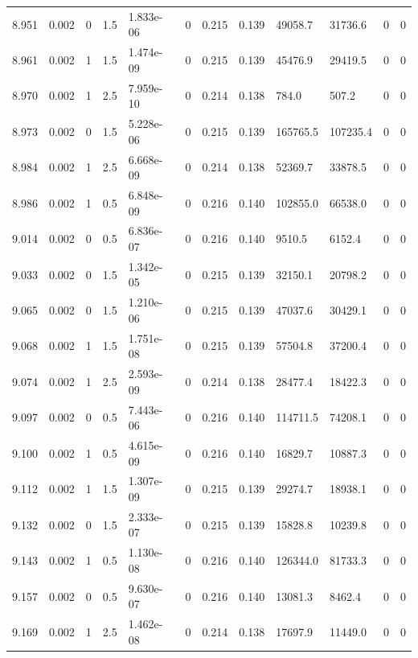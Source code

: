 \documentclass[preview]{standalone}
\begin{document}
{{{{{{{{{{{{{{{{\begin{tabular}{L{1.2cm}C{1.2cm} C{0.3cm}C{0.5cm} C{1.4cm}C{1.4cm} C{1.4cm}C{1.4cm} C{1.6cm}C{1.6cm} C{1.6cm}C{1.6cm}}
  8.951  &  0.002  & 0     & 1.5 &  1.833e-06  & 0  &  0.215&   0.139& 49058.7 & 31736.6   &  0 & 0  \\ 
  8.961  &  0.002  & 1     & 1.5 &  1.474e-09  & 0  &  0.215&   0.139& 45476.9 & 29419.5   &  0 & 0  \\ 
  8.970  &  0.002  & 1     & 2.5 &  7.959e-10  & 0  &  0.214&   0.138& 784.0 & 507.2   &  0 & 0  \\ 
  8.973  &  0.002  & 0     & 1.5 &  5.228e-06  & 0  &  0.215&   0.139& 165765.5 & 107235.4   &  0 & 0  \\ 
  8.984  &  0.002  & 1     & 2.5 &  6.668e-09  & 0  &  0.214&   0.138& 52369.7 & 33878.5   &  0 & 0  \\ 
  8.986  &  0.002  & 1     & 0.5 &  6.848e-09  & 0  &  0.216&   0.140& 102855.0 & 66538.0   &  0 & 0  \\ 
  9.014  &  0.002  & 0     & 0.5 &  6.836e-07  & 0  &  0.216&   0.140& 9510.5 & 6152.4   &  0 & 0  \\ 
  9.033  &  0.002  & 0     & 1.5 &  1.342e-05  & 0  &  0.215&   0.139& 32150.1 & 20798.2   &  0 & 0  \\ 
  9.065  &  0.002  & 0     & 1.5 &  1.210e-06  & 0  &  0.215&   0.139& 47037.6 & 30429.1   &  0 & 0  \\ 
  9.068  &  0.002  & 1     & 1.5 &  1.751e-08  & 0  &  0.215&   0.139& 57504.8 & 37200.4   &  0 & 0  \\ 
  9.074  &  0.002  & 1     & 2.5 &  2.593e-09  & 0  &  0.214&   0.138& 28477.4 & 18422.3   &  0 & 0  \\ 
  9.097  &  0.002  & 0     & 0.5 &  7.443e-06  & 0  &  0.216&   0.140& 114711.5 & 74208.1   &  0 & 0  \\ 
  9.100  &  0.002  & 1     & 0.5 &  4.615e-09  & 0  &  0.216&   0.140& 16829.7 & 10887.3   &  0 & 0  \\ 
  9.112  &  0.002  & 1     & 1.5 &  1.307e-09  & 0  &  0.215&   0.139& 29274.7 & 18938.1   &  0 & 0  \\ 
  9.132  &  0.002  & 0     & 1.5 &  2.333e-07  & 0  &  0.215&   0.139& 15828.8 & 10239.8   &  0 & 0  \\ 
  9.143  &  0.002  & 1     & 0.5 &  1.130e-08  & 0  &  0.216&   0.140& 126344.0 & 81733.3   &  0 & 0  \\ 
  9.157  &  0.002  & 0     & 0.5 &  9.630e-07  & 0  &  0.216&   0.140& 13081.3 & 8462.4   &  0 & 0  \\ 
  9.169  &  0.002  & 1     & 2.5 &  1.462e-08  & 0  &  0.214&   0.138& 17697.9 & 11449.0   &  0 & 0  \\ 

\end{tabular}}}}}}}}}}}}}}}}}
\end{document}
